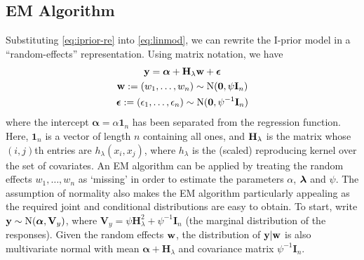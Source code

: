 \subsection{EM Algorithm}

Substituting \eqref{eq:iprior-re} into \eqref{eq:linmod}, we can rewrite the I-prior model in a ``random-effects'' representation. Using matrix notation, we have%
\begin{align}\label{eq:iprior-re2}
	\begin{gathered}
		\mathbf y = \boldsymbol{\alpha} + \mathbf H_\lambda{\mathbf w} + \boldsymbol\epsilon \\
		{\mathbf w} := (w_1, \dots, w_n) \sim \operatorname{N}(\mathbf 0, \psi\mathbf I_n) \\
		\boldsymbol\epsilon := (\epsilon_1, \dots, \epsilon_n) \sim \operatorname{N}(\mathbf 0, \psi^{-1} \mathbf I_n) 
	\end{gathered}
\end{align}
where the intercept $\boldsymbol\alpha = \alpha \mathbf 1_{n}$ has been separated from the regression function. 
Here, $\mathbf 1_{n}$ is a vector of length $n$ containing all ones, and $\mathbf H_\lambda$ is the matrix whose $(i,j)$th entries are $h_\lambda(x_i, x_j)$, where $h_\lambda$ is the (scaled) reproducing kernel over the set of covariates. 
An EM algorithm can be applied by treating the random effects $w_1, \dots, w_n$ as `missing' in order to estimate the parameters $\alpha$, $\boldsymbol\lambda$ and $\psi$. 
The assumption of normality also makes the EM algorithm particularly appealing as the required joint and conditional distributions are easy to obtain. 
To start, write $\mathbf y \sim \operatorname{N}(\boldsymbol\alpha, \mathbf V_y)$, where $\mathbf V_y = \psi{\mathbf H}_{\lambda}^2 + \psi^{-1}\mathbf I_n$ (the marginal distribution of the responses). 
Given the random effects ${\mathbf w}$, the distribution of $\mathbf y|{\mathbf w}$ is also multivariate normal with mean $\boldsymbol\alpha + \mathbf H_\lambda$ and covariance matrix $\psi^{-1}\mathbf I_n$.

